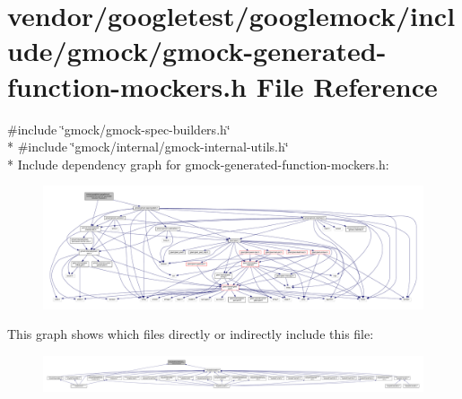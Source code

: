 \hypertarget{gmock-generated-function-mockers_8h}{}\section{vendor/googletest/googlemock/include/gmock/gmock-\/generated-\/function-\/mockers.h File Reference}
\label{gmock-generated-function-mockers_8h}
{\ttfamily \#include \char`\"{}gmock/gmock-\/spec-\/builders.\+h\char`\"{}}\\*
{\ttfamily \#include \char`\"{}gmock/internal/gmock-\/internal-\/utils.\+h\char`\"{}}\\*
Include dependency graph for gmock-\/generated-\/function-\/mockers.h\+:
\nopagebreak
\begin{figure}[H]
\begin{center}
\leavevmode
\includegraphics[width=350pt]{gmock-generated-function-mockers_8h__incl}
\end{center}
\end{figure}
This graph shows which files directly or indirectly include this file\+:
\nopagebreak
\begin{figure}[H]
\begin{center}
\leavevmode
\includegraphics[width=350pt]{gmock-generated-function-mockers_8h__dep__incl}
\end{center}
\end{figure}
